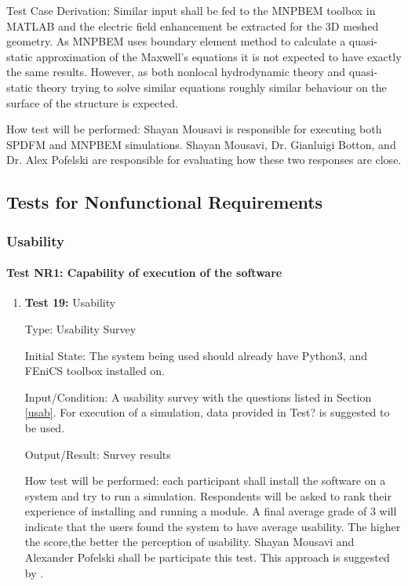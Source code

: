 \documentclass[12pt, titlepage]{article}
\begin{document}
\begin{enumerate}
Test Case Derivation: Similar input shall be fed to the MNPBEM toolbox in  MATLAB and the electric field enhancement be extracted for the 3D meshed geometry. As MNPBEM uses boundary element method to calculate a quasi-static approximation of the Maxwell's equations it is not expected to have exactly the same results. However, as both nonlocal hydrodynamic theory and quasi-static theory trying to solve similar equations roughly similar behaviour on the surface of the structure is expected.     

How test will be performed: Shayan Mousavi is responsible for executing both SPDFM and MNPBEM simulations. Shayan Mousavi, Dr. Gianluigi Botton, and Dr. Alex Pofelski are responsible for evaluating how these two responses are close.


\end{enumerate}
	

\subsection{Tests for Nonfunctional Requirements}
\label{nonfunc}

\subsubsection{Usability}
		
\paragraph{Test NR1: Capability of execution of the software}

\begin{enumerate}

\item{\textbf{Test 19:} Usability \\}

Type: Usability Survey
					
Initial State: The system being used should already have Python3, and FEniCS toolbox installed on.  
					
Input/Condition: A usability survey with the questions listed in Section \ref{usab}. For execution of a simulation, data provided in Test? is suggested to be used.
					
Output/Result: Survey results
					
How test will be performed: each participant shall install the software on a system and try to run a simulation. Respondents will be asked to rank their experience of installing and running a module. A final average grade of 3 will indicate that the users found the system to have average usability. The higher the score,the better the perception of usability. Shayan Mousavi and Alexander Pofelski shall be participate this test. This approach is suggested by \cite{LatticeB41:online}.

\end{enumerate}
\end{document}
